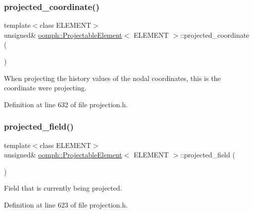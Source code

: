 \subsubsection{\texorpdfstring{projected\+\_\+coordinate()}{projected\_coordinate()}}
{\footnotesize\ttfamily template$<$class E\+L\+E\+M\+E\+NT$>$ \\
unsigned\& \hyperlink{classoomph_1_1ProjectableElement}{oomph\+::\+Projectable\+Element}$<$ E\+L\+E\+M\+E\+NT $>$\+::projected\+\_\+coordinate (\begin{DoxyParamCaption}{ }\end{DoxyParamCaption})\hspace{0.3cm}{\ttfamily [inline]}}



When projecting the history values of the nodal coordinates, this is the coordinate we\textquotesingle{}re projecting. 



Definition at line 632 of file projection.\+h.

\mbox{\label{classoomph_1_1ProjectableElement_a1d5640979b055e358f10c5a4b8cfb3b3}} 
\subsubsection{\texorpdfstring{projected\+\_\+field()}{projected\_field()}}
{\footnotesize\ttfamily template$<$class E\+L\+E\+M\+E\+NT$>$ \\
unsigned\& \hyperlink{classoomph_1_1ProjectableElement}{oomph\+::\+Projectable\+Element}$<$ E\+L\+E\+M\+E\+NT $>$\+::projected\+\_\+field (\begin{DoxyParamCaption}{ }\end{DoxyParamCaption})\hspace{0.3cm}{\ttfamily [inline]}}



Field that is currently being projected. 



Definition at line 623 of file projection.\+h.

\mbox{\label{classoomph_1_1ProjectableElement_a8ee3e91f6fdedeb5e6979e162437b2be}} 
